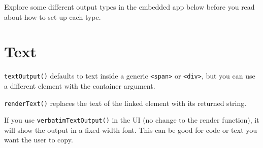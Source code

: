 \documentclass[
  oneside]{book}
\newenvironment{Shaded}{\begin{snugshade}}{\end{snugshade}}
\newcommand{\AttributeTok}[1]{\textcolor[rgb]{0.77,0.63,0.00}{#1}}
\newcommand{\CommentTok}[1]{\textcolor[rgb]{0.56,0.35,0.01}{\textit{#1}}}
\newcommand{\FunctionTok}[1]{\textcolor[rgb]{0.00,0.00,0.00}{#1}}
\newcommand{\NormalTok}[1]{#1}
\newcommand{\OtherTok}[1]{\textcolor[rgb]{0.56,0.35,0.01}{#1}}
\newcommand{\SpecialCharTok}[1]{\textcolor[rgb]{0.00,0.00,0.00}{#1}}
\newcommand{\StringTok}[1]{\textcolor[rgb]{0.31,0.60,0.02}{#1}}
\begin{document}
Explore some different output types in the embedded app below before you read about how to set up each type.

\hypertarget{text}{%
\section{Text}\label{text}}

\texttt{textOutput}\texttt{()} defaults to text inside a generic \texttt{\textless{}span\textgreater{}} or \texttt{\textless{}div\textgreater{}}, but you can use a different element with the \AttributeTok{container} argument.

\begin{Shaded}
\end{Shaded}

\texttt{renderText}\texttt{()} replaces the text of the linked element with its returned string.

\begin{Shaded}
\end{Shaded}

If you use \texttt{verbatimTextOutput}\texttt{()} in the UI (no change to the render function), it will show the output in a fixed-width font. This can be good for code or text you want the user to copy.

\begin{Shaded}
\end{Shaded}
\end{document}

